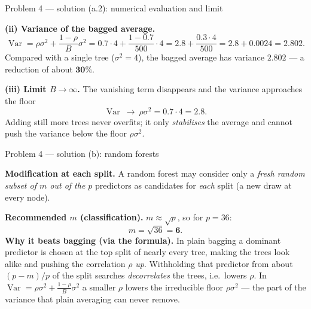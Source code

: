 \documentclass[aspectratio=169,11pt]{beamer}
\begin{document}
\begin{frame}{Problem 4 --- solution (a.2): numerical evaluation and limit}
  \begin{solutionbox}
    \textbf{(ii) Variance of the bagged average.}
    \[
      \operatorname{Var}=\rho\sigma^2+\frac{1-\rho}{B}\sigma^2
      =0.7\cdot 4+\frac{1-0.7}{500}\cdot 4
      =2.8+\frac{0.3\cdot 4}{500}=2.8+0.0024=\mathbf{2.802}.
    \]
    Compared with a single tree ($\sigma^2=4$), the bagged average has variance $2.802$ --- a
    reduction of about $\mathbf{30\%}$.
    \medskip

    \textbf{(iii) Limit $B\to\infty$.} The vanishing term disappears and the variance approaches the
    floor
    \[
      \operatorname{Var}\ \longrightarrow\ \rho\sigma^2=0.7\cdot 4=\mathbf{2.8}.
    \]
    Adding still more trees never overfits; it only \emph{stabilises} the average and cannot push
    the variance below the floor $\rho\sigma^2$.
  \end{solutionbox}
\end{frame}

\begin{frame}{Problem 4 --- solution (b): random forests}
  \begin{solutionbox}
    \textbf{Modification at each split.} A random forest may consider only a \emph{fresh random
    subset of $m$ out of the $p$} predictors as candidates for \emph{each} split (a new draw at
    every node).
    \medskip

    \textbf{Recommended $m$ (classification).} $m\approx\sqrt p$, so for $p=36$:
    \[
      m=\sqrt{36}=\mathbf{6}.
    \]
    \textbf{Why it beats bagging (via the formula).} In plain bagging a dominant predictor is chosen
    at the top split of nearly every tree, making the trees look alike and pushing the correlation
    $\rho$ \emph{up}. Withholding that predictor from about $(p-m)/p$ of the split searches
    \emph{decorrelates} the trees, i.e.\ lowers $\rho$. In
    $\operatorname{Var}=\rho\sigma^2+\frac{1-\rho}{B}\sigma^2$ a smaller $\rho$ lowers the
    irreducible floor $\rho\sigma^2$ --- the part of the variance that plain averaging can never remove.
  \end{solutionbox}
\end{frame}
\end{document}
